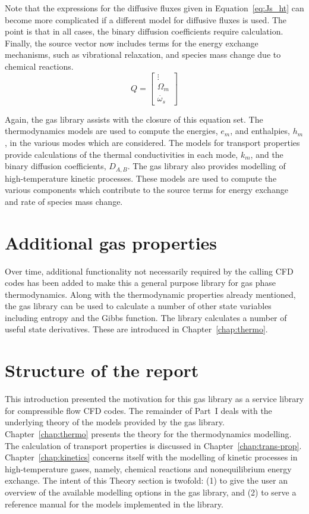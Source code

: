 Note that the expressions for the diffusive fluxes given in Equation~\ref{eq:Js_ht} can become more complicated if a different model for diffusive fluxes is used.
The point is that in all cases, the binary diffusion coefficients require calculation.
Finally, the source vector now includes terms for the energy exchange mechanisms,
such as vibrational relaxation, and species mass change due to chemical reactions.
\begin{equation}
Q  = \left [ \begin{array}{c} 
             \vdots \\
             \Omega_{m} \\
             \dot{\omega_s}
             \end{array} \right ]
\end{equation}

Again, the gas library assists with the closure of this equation set.
The thermodynamics models are used to compute the energies, $e_m$,
and enthalpies, $h_m$, in the various modes which are considered.
The models for transport properties provide calculations of
the thermal conductivities in each mode, $k_m$, and the binary
diffusion coefficients, $D_{A,B}$.
The gas library also provides modelling of high-temperature kinetic
processes.
These models are used to compute the various components which contribute
to the source terms for energy exchange and rate of species mass change.

\section{Additional gas properties}
Over time, additional functionality not necessarily required by the calling
CFD codes has been added to make this a general purpose library for
gas phase thermodynamics.
Along with the thermodynamic properties already mentioned, the gas library can be used to
calculate a number of other state variables including entropy and the Gibbs function.
The library calculates a number of useful state derivatives.
These are introduced in Chapter~\ref{chap:thermo}.

\section{Structure of the report}

This introduction presented the motivation for this gas library as a service library
for compressible flow CFD codes.
The remainder of Part~I deals with the underlying theory of the models provided
by the gas library.
Chapter~\ref{chap:thermo} presents the theory for the thermodynamics modelling.
The calculation of transport properties is discussed in Chapter~\ref{chap:trans-prop}.
Chapter~\ref{chap:kinetics} concerns itself with the modelling of kinetic processes
in high-temperature gases, namely, chemical reactions and nonequilibrium energy exchange.
The intent of this Theory section is twofold: (1) to give the user an overview of the available modelling options in the gas library, and (2) to serve a reference manual for the models implemented in the library.

